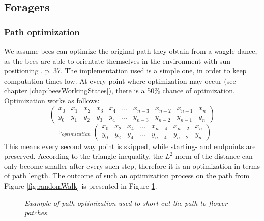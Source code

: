 \subsection{Foragers}
	\subsubsection{Path optimization}
		\label{chap:pathOptimization}
		
		We assume bees can optimize the original path they obtain from a waggle dance, as the bees are able to orientate themselves in the environment with sun positioning \cite{seeley95}, p. 37. The implementation used is a simple one, in order to keep computation times low. At every point where optimization may occur (see chapter \ref{chap:beesWorkingStates}), there is a 50\% chance of optimization. Optimization works as follows:
		\[
			\begin{pmatrix}
				x_0 & x_1 & x_2 & x_3 & x_4 & \ldots & x_{n-3} & x_{n-2} & x_{n-1} & x_n \\
				y_0 & y_1 & y_2 & y_3 & y_4 & \ldots & y_{n-3} & y_{n-2} & y_{n-1} & y_n
			\end{pmatrix}
		\]
		\[
			\Longrightarrow_{optimization}
			\begin{pmatrix}
				x_0 & x_2 & x_4 & \ldots & x_{n-4} & x_{n-2} & x_{n} \\ y_0 & y_2 & y_4 & \ldots & y_{n-4} & y_{n-2} & y_{n}
			\end{pmatrix}
		\]
		This means every second way point is skipped, while starting- and endpoints are preserved. According to the triangle inequality, the $L^2$ norm of the distance can only become smaller after every such step, therefore it is an optimization in terms of path length. The outcome of such an optimization process on the path from Figure \ref{fig:randomWalk} is presented in Figure \ref{fig:pathOptimization}.\\
		
		\begin{figure}[H]
			\centering
			\caption{\textit{Example of path optimization used to short cut the path to flower patches.}}
			\label{fig:pathOptimization}
		\end{figure}
		
